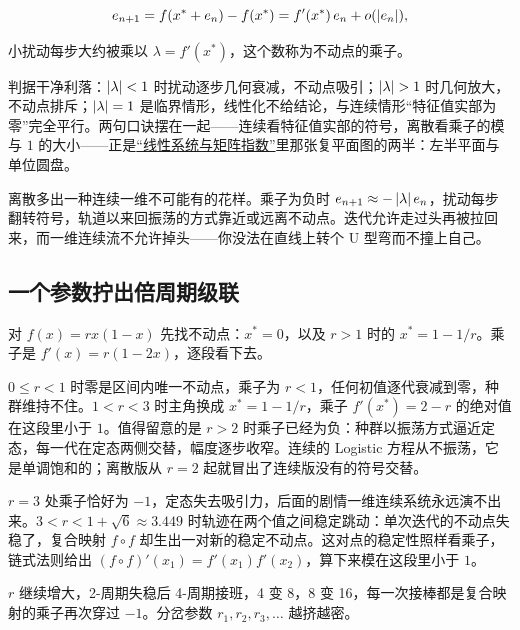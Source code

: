 \[
e_{n+1}=f(x^\ast+e_n)-f(x^\ast)=f'(x^\ast)\,e_n+o(\left|e_n\right|),
\]

小扰动每步大约被乘以 \(\lambda=f'(x^\ast)\)，这个数称为不动点的乘子。

判据干净利落：\(\left|\lambda\right|<1\) 时扰动逐步几何衰减，不动点吸引；\(\abs{\lambda}>1\) 时几何放大，不动点排斥；\(\left|\lambda\right|=1\) 是临界情形，线性化不给结论，与连续情形``特征值实部为零''完全平行。两句口诀摆在一起——连续看特征值实部的符号，离散看乘子的模与 \(1\) 的大小——正是\hyperref[sec:15-Differential-Equations-and-Dynamical-Systems/01-ODE-Theory/02]{``线性系统与矩阵指数''}里那张复平面图的两半：左半平面与单位圆盘。

离散多出一种连续一维不可能有的花样。乘子为负时 \(e_{n+1}\approx-\left|\lambda\right|e_n\)，扰动每步翻转符号，轨道以来回振荡的方式靠近或远离不动点。迭代允许走过头再被拉回来，而一维连续流不允许掉头——你没法在直线上转个 U 型弯而不撞上自己。

\subsection{一个参数拧出倍周期级联}

对 \(f(x)=rx(1-x)\) 先找不动点：\(x^\ast=0\)，以及 \(r>1\) 时的 \(x^\ast=1-1/r\)。乘子是 \(f'(x)=r(1-2x)\)，逐段看下去。

\(0\le r<1\) 时零是区间内唯一不动点，乘子为 \(r<1\)，任何初值逐代衰减到零，种群维持不住。\(1<r<3\) 时主角换成 \(x^\ast=1-1/r\)，乘子 \(f'(x^\ast)=2-r\) 的绝对值在这段里小于 \(1\)。值得留意的是 \(r>2\) 时乘子已经为负：种群以振荡方式逼近定态，每一代在定态两侧交替，幅度逐步收窄。连续的 Logistic 方程从不振荡，它是单调饱和的；离散版从 \(r=2\) 起就冒出了连续版没有的符号交替。

\(r=3\) 处乘子恰好为 \(-1\)，定态失去吸引力，后面的剧情一维连续系统永远演不出来。\(3<r<1+\sqrt6\approx3.449\) 时轨迹在两个值之间稳定跳动：单次迭代的不动点失稳了，复合映射 \(f\circ f\) 却生出一对新的稳定不动点。这对点的稳定性照样看乘子，链式法则给出 \((f\circ f)'(x_1)=f'(x_1)f'(x_2)\)，算下来模在这段里小于 \(1\)。

\(r\) 继续增大，2-周期失稳后 4-周期接班，4 变 8，8 变 16，每一次接棒都是复合映射的乘子再次穿过 \(-1\)。分岔参数 \(r_1,r_2,r_3,\ldots\) 越挤越密。

